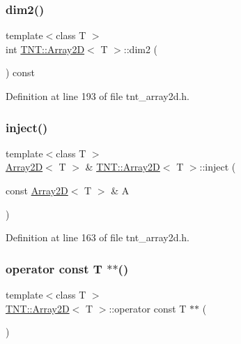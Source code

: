 \subsubsection{\texorpdfstring{dim2()}{dim2()}}
{\footnotesize\ttfamily template$<$class T $>$ \\
int \hyperlink{classTNT_1_1Array2D}{T\+N\+T\+::\+Array2D}$<$ T $>$\+::dim2 (\begin{DoxyParamCaption}{ }\end{DoxyParamCaption}) const\hspace{0.3cm}{\ttfamily [inline]}}



Definition at line 193 of file tnt\+\_\+array2d.\+h.

\mbox{\label{classTNT_1_1Array2D_a24f86f6bf4fd6436946c82e55a12af24}} 
\subsubsection{\texorpdfstring{inject()}{inject()}}
{\footnotesize\ttfamily template$<$class T $>$ \\
\hyperlink{classTNT_1_1Array2D}{Array2D}$<$ T $>$ \& \hyperlink{classTNT_1_1Array2D}{T\+N\+T\+::\+Array2D}$<$ T $>$\+::inject (\begin{DoxyParamCaption}\item[{const \hyperlink{classTNT_1_1Array2D}{Array2D}$<$ T $>$ \&}]{A }\end{DoxyParamCaption})}



Definition at line 163 of file tnt\+\_\+array2d.\+h.

\mbox{\label{classTNT_1_1Array2D_a38bf24494047929cb39c89b5c9c516f7}} 
\subsubsection{\texorpdfstring{operator const T $\ast$$\ast$()}{operator const T **()}}
{\footnotesize\ttfamily template$<$class T $>$ \\
\hyperlink{classTNT_1_1Array2D}{T\+N\+T\+::\+Array2D}$<$ T $>$\+::operator const T $\ast$$\ast$ (\begin{DoxyParamCaption}{ }\end{DoxyParamCaption})\hspace{0.3cm}{\ttfamily [inline]}}



